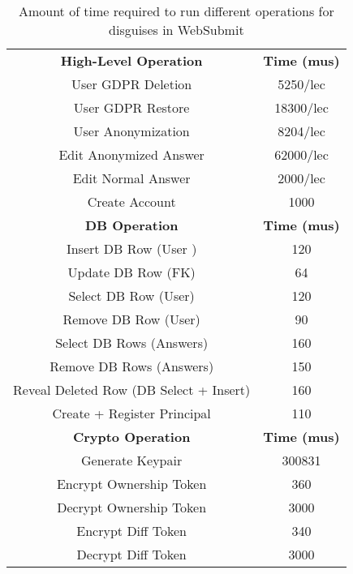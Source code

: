 \begin{table}
\begin{center}
\begin{tabular}{ c c }
 \textbf{High-Level Operation} & \textbf{Time (mus)}\\
    User GDPR Deletion & 5250/lec\\
    User GDPR Restore & 18300/lec\\
    User Anonymization & 8204/lec\\
    Edit Anonymized Answer & 62000/lec \\
    Edit Normal Answer & 2000/lec \\
    Create Account & 1000\\
\hline
    \textbf{DB Operation} & \textbf{Time (mus)}\\
\hline
Insert DB Row (User )& 120\\
Update DB Row (FK) & 64\\ 
Select DB Row (User) & 120\\
Remove DB Row (User) & 90\\
Select DB Rows (Answers) & 160\\
Remove DB Rows (Answers) & 150\\
Reveal Deleted Row (DB Select + Insert) & 160 \\
Create + Register Principal & 110\\
\hline
    \textbf{Crypto Operation} & \textbf{Time (mus)}\\
\hline
Generate Keypair & 300831\\
Encrypt Ownership Token & 360\\
Decrypt Ownership Token & 3000\\
Encrypt Diff Token & 340\\
Decrypt Diff Token & 3000\\
\end{tabular}
\end{center}
\caption{Amount of time required to run different operations for disguises in WebSubmit}
\end{table}
